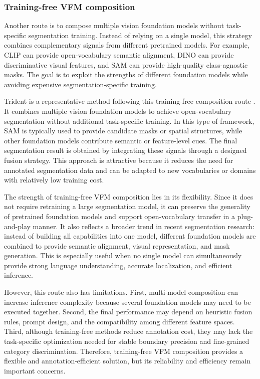 \subsubsection{Training-free VFM composition}

Another route is to compose multiple vision foundation models without task-specific segmentation training. 
Instead of relying on a single model, this strategy combines complementary signals from different pretrained models. 
For example, CLIP can provide open-vocabulary semantic alignment, DINO can provide discriminative visual features, and SAM can provide high-quality class-agnostic masks. 
The goal is to exploit the strengths of different foundation models while avoiding expensive segmentation-specific training.

Trident is a representative method following this training-free composition route \cite{Shi2025}. 
It combines multiple vision foundation models to achieve open-vocabulary segmentation without additional task-specific training. 
In this type of framework, SAM is typically used to provide candidate masks or spatial structures, while other foundation models contribute semantic or feature-level cues. 
The final segmentation result is obtained by integrating these signals through a designed fusion strategy. 
This approach is attractive because it reduces the need for annotated segmentation data and can be adapted to new vocabularies or domains with relatively low training cost.

The strength of training-free VFM composition lies in its flexibility. 
Since it does not require retraining a large segmentation model, it can preserve the generality of pretrained foundation models and support open-vocabulary transfer in a plug-and-play manner. 
It also reflects a broader trend in recent segmentation research: instead of building all capabilities into one model, different foundation models are combined to provide semantic alignment, visual representation, and mask generation. 
This is especially useful when no single model can simultaneously provide strong language understanding, accurate localization, and efficient inference.

However, this route also has limitations. 
First, multi-model composition can increase inference complexity because several foundation models may need to be executed together. 
Second, the final performance may depend on heuristic fusion rules, prompt design, and the compatibility among different feature spaces. 
Third, although training-free methods reduce annotation cost, they may lack the task-specific optimization needed for stable boundary precision and fine-grained category discrimination. 
Therefore, training-free VFM composition provides a flexible and annotation-efficient solution, but its reliability and efficiency remain important concerns.

